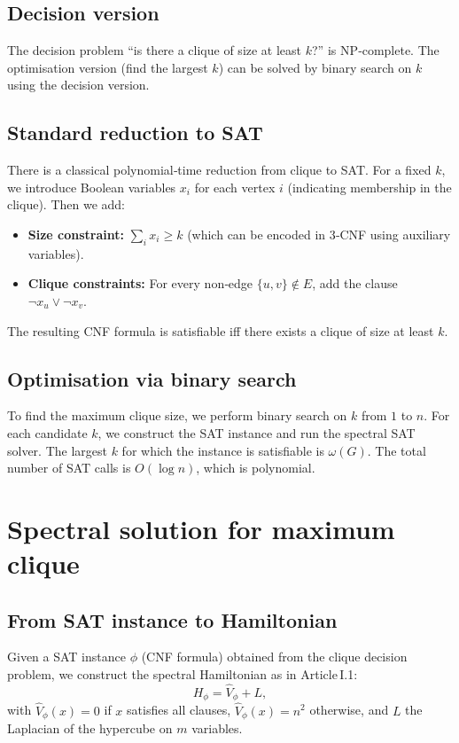 \documentclass[11pt,a4paper]{article}
\begin{document}
\subsection{Decision version}
The decision problem “is there a clique of size at least \(k\)?” is NP‑complete. The optimisation version (find the largest \(k\)) can be solved by binary search on \(k\) using the decision version.

\subsection{Standard reduction to SAT}
There is a classical polynomial‑time reduction from clique to SAT. For a fixed \(k\), we introduce Boolean variables \(x_{i}\) for each vertex \(i\) (indicating membership in the clique). Then we add:
\begin{itemize}
\item \textbf{Size constraint:} \(\sum_{i} x_i \ge k\) (which can be encoded in 3‑CNF using auxiliary variables).
\item \textbf{Clique constraints:} For every non‑edge \(\{u,v\}\notin E\), add the clause \(\neg x_u \vee \neg x_v\).
\end{itemize}
The resulting CNF formula is satisfiable iff there exists a clique of size at least \(k\).

\subsection{Optimisation via binary search}
To find the maximum clique size, we perform binary search on \(k\) from \(1\) to \(n\). For each candidate \(k\), we construct the SAT instance and run the spectral SAT solver. The largest \(k\) for which the instance is satisfiable is \(\omega(G)\). The total number of SAT calls is \(O(\log n)\), which is polynomial.

\section{Spectral solution for maximum clique}

\subsection{From SAT instance to Hamiltonian}
Given a SAT instance \(\phi\) (CNF formula) obtained from the clique decision problem, we construct the spectral Hamiltonian as in Article I.1:
\[
H_{\phi} = \hat{V}_{\phi} + L,
\]
with \(\hat{V}_{\phi}(x)=0\) if \(x\) satisfies all clauses, \(\hat{V}_{\phi}(x)=n^2\) otherwise, and \(L\) the Laplacian of the hypercube on \(m\) variables.
\end{document}

